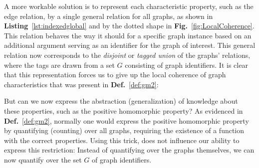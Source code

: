 A more workable solution is to represent each characteristic property, such as the edge relation, by a single general relation for all graphs, as shown in \textbf{Listing}~\ref{lst:indexedglobal} and by the dotted shape in \textbf{Fig.}~\ref{fig:LocalCoherence}.
This relation behaves the way it should for a specific graph instance based on an additional argument serving as an identifier for the graph of interest.
This general relation now corresponds to the \emph{disjoint} or \emph{tagged union} of the graphs' relations, where the tags are drawn from a set $G$ consisting of graph identifiers.
It is clear that this representation forces us to give up the local coherence of graph characteristics that was present in \textbf{Def.}~\ref{def:gm2}: 


But can we now express the abstraction (generalization) of knowledge about these properties, such as the positive homomorphic property?
As evidenced in \textbf{Def.}~\ref{def:gm2}, normally one would express the positive homomorphic property by quantifying (counting) over all graphs, requiring the existence of a function with the correct properties.
Using this trick, does not influence our ability to express this restriction: Instead of quantifying over the graphs themselves, we can now quantify over the set $G$ of graph identifiers.

